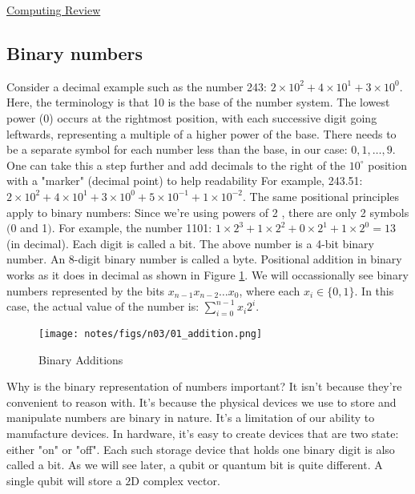 \documentclass[main.tex]{subfiles}
\begin{document}
\href{https://www2.seas.gwu.edu/~simhaweb/quantum/modules/review/comp-review/comp-review.html}{Computing Review}

\subsection{Binary numbers}

Consider a decimal example such as the number 243: $2 \times 10^{2}+4 \times 10^{1}+3 \times 10^{0}$. Here, the terminology is that 10 is the base of the number system. The lowest power (0) occurs at the rightmost position, with each successive digit going leftwards, representing a multiple of a higher power of the base. There needs to be a separate symbol for each number less than the base, in our case: $0,1, \ldots, 9$. One can take this a step further and add decimals to the right of the $10^{\circ}$ position with a "marker" (decimal point) to help readability For example, 243.51: $2 \times 10^{2}+4 \times 10^{1}+3 \times 10^{0}+5 \times 10^{-1}+1 \times 10^{-2}$. The same positional principles apply to binary numbers: Since we're using powers of 2 , there are only 2 symbols $(0$ and 1$)$. For example, the number 1101: $1 \times 2^{3}+1 \times 2^{2}+0 \times 2^{1}+1 \times 2^{0}=13$ (in decimal). Each digit is called a bit. The above number is a 4-bit binary number. An 8-digit binary number is called a byte. Positional addition in binary works as it does in decimal as shown in Figure \ref{fig:01_addition}. We will occassionally see binary numbers represented by the bits $x_{n-1} x_{n-2} \ldots x_{0}$, where each $x_{i} \in\{0,1\}$. In this case, the actual value of the number is: $\sum_{i=0}^{n-1} x_{i} 2^{i}$.\\

\begin{figure}
    \centering
    \texttt{[image: notes/figs/n03/01\_addition.png]}
    \caption{Binary Additions}
    \label{fig:01_addition}
\end{figure}

Why is the binary representation of numbers important? It isn't because they're convenient to reason with. It's because the physical devices we use to store and manipulate numbers are binary in nature. It's a limitation of our ability to manufacture devices. In hardware, it's easy to create devices that are two state: either "on" or "off". Each such storage device that holds one binary digit is also called a bit. As we will see later, a qubit or quantum bit is quite different. A single qubit will store a $2 \mathrm{D}$ complex vector.
\end{document}
